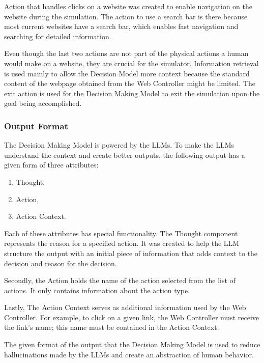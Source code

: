 Action that handles clicks on a website was created to enable navigation on the website during the simulation. The action to use a search bar is there because most current websites have a search bar, which enables fast navigation and searching for detailed information. 

Even though the last two actions are not part of the physical actions a human would make on a website, they are crucial for the simulator. Information retrieval is used mainly to allow the Decision Model more context because the standard content of the webpage obtained from the Web Controller might be limited. The exit action is used for the Decision Making Model to exit the simulation upon the goal being accomplished.

\subsubsection{Output Format}

The Decision Making Model is powered by the LLMs. To make the LLMs understand the context and create better outputs, the following output has a given form of three attributes:

\begin{enumerate}
    \item Thought,
    \item Action,
    \item Action Context.
\end{enumerate}


Each of these attributes has special functionality. The Thought component represents the reason for a specified action. It was created to help the LLM structure the output with an initial piece of information that adds context to the decision and reason for the decision.

Secondly, the Action holds the name of the action selected from the list of actions. It only contains information about the action type.

Lastly, The Action Context serves as additional information used by the Web Controller. For example, to click on a given link, the Web Controller must receive the link's name; this name must be contained in the Action Context. 

The given format of the output that the Decision Making Model is used to reduce hallucinations made by the LLMs and create an abstraction of human behavior. 


